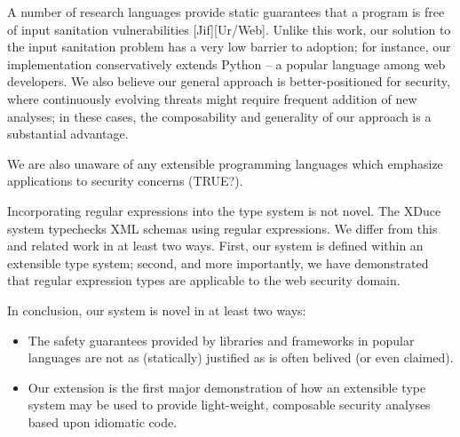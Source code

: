 \documentclass{acm_proc_article-sp}
\theoremstyle{definition}
\begin{document}
A number of research languages provide static guarantees that a program is free of input sanitation vulnerabilities [Jif][Ur/Web]. 
Unlike this work, our solution to the input sanitation problem has a very low barrier to adoption; for instance, our implementation conservatively extends Python -- a popular language among web developers.
We also believe our general approach is better-positioned for security, where continuously evolving threats might require frequent addition of new analyses; in these cases, the composability and generality of our approach is a substantial advantage.


We are also unaware of any extensible programming languages which emphasize applications to security concerns (TRUE?).

Incorporating regular expressions into the type system is not novel. The XDuce system \cite{pierce} typechecks XML schemas using regular expressions. We differ from this and related work in at least two ways. First, our system  is defined within an extensible type system; second, and more importantly, we have demonstrated that regular expression types are applicable to the web security domain.

In conclusion, our system is novel in at least two ways:
\begin{itemize}
\item The safety guarantees provided by libraries and frameworks in popular languages
are not as (statically) justified as is often belived (or even claimed).
\item Our extension is the first major demonstration of how an extensible type
system may be used to provide light-weight, composable security analyses based upon
idiomatic code.
\end{itemize}
\end{document}
